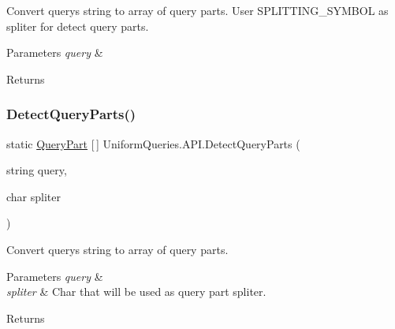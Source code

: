 Convert query\textquotesingle{}s string to array of query parts. User S\+P\+L\+I\+T\+T\+I\+N\+G\+\_\+\+S\+Y\+M\+B\+OL as spliter for detect query parts. 


\begin{DoxyParams}{Parameters}
{\em query} & \\
\hline
\end{DoxyParams}
\begin{DoxyReturn}{Returns}

\end{DoxyReturn}
\mbox{\label{class_uniform_queries_1_1_a_p_i_ab5875a3346878ba21ab331ba07889e92}} 
\subsubsection{\texorpdfstring{Detect\+Query\+Parts()}{DetectQueryParts()}\hspace{0.1cm}{\footnotesize\ttfamily [2/2]}}
{\footnotesize\ttfamily static \mbox{\hyperlink{struct_uniform_queries_1_1_query_part}{Query\+Part}} \mbox{[}$\,$\mbox{]} Uniform\+Queries.\+A\+P\+I.\+Detect\+Query\+Parts (\begin{DoxyParamCaption}\item[{string}]{query,  }\item[{char}]{spliter }\end{DoxyParamCaption})\hspace{0.3cm}{\ttfamily [static]}}



Convert query\textquotesingle{}s string to array of query parts. 


\begin{DoxyParams}{Parameters}
{\em query} & \\
\hline
{\em spliter} & Char that will be used as query part spliter.\\
\hline
\end{DoxyParams}
\begin{DoxyReturn}{Returns}

\end{DoxyReturn}
\mbox{\label{class_uniform_queries_1_1_a_p_i_aa8a8215bbad2752c291803011dc49ff4}} 
